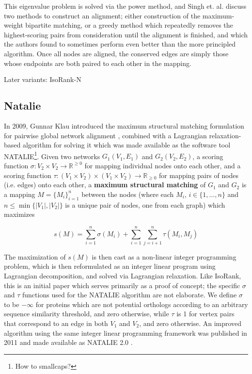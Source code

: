 \documentclass[12pt]{thesis}
\theoremstyle{plain}
\theoremstyle{definition}
\theoremstyle{remark}
\newcommand{\R}{\mathbb{R}}
\begin{document}
This eigenvalue problem is solved via the power method, and Singh et. al. discuss two methods to construct an alignment; either construction of the maximum-weight bipartite matching, or a greedy method which repeatedly removes the highest-scoring pairs from consideration until the alignment is finished, and which the authors found to sometimes perform even better than the more principled algorithm. Once all nodes are aligned, the conserved edges are simply those whose endpoints are both paired to each other in the mapping.

Later variants: IsoRank-N

\subsection{Natalie}

In 2009, Gunnar Klau introduced the maximum structural matching formulation for pairwise global network alignment \cite{Klau_2009}, combined with a Lagrangian relaxation-based algorithm for solving it which was made available as the software tool NATALIE\footnote{How to smallcaps?}. Given two networks $G_1(V_1,E_1)$ and $G_2(V_2,E_2)$, a scoring function $\sigma:V_2\times V_2\rightarrow \R^{\geq 0}$ for mapping individual nodes onto each other, and a scoring function $\tau:(V_1\times V_2)\times (V_1\times V_2)\rightarrow\R_{\geq 0}$ for mapping pairs of nodes (i.e. edges) onto each other, a \textbf{maximum structural matching} of $G_1$ and $G_2$ is a mapping $M=\{M_i\}_{i=1}^n$ between the nodes (where each $M_i$, $i\in \{1,\dots,n\}$ and $n\leq \min\{|V_1|,|V_2|\}$ is a unique pair of nodes, one from each graph) which maximizes

\[s(M) = \sum_{i=1}^n \sigma(M_i) + \sum_{i=1}^n \sum_{j=i+1}^n \tau(M_i,M_j) \]

The maximization of $s(M)$ is then cast as a non-linear integer programming problem, which is then reformulated as an integer linear program using Lagrangian decomposition, and solved via Lagrangian relaxation. Like IsoRank, this is an initial paper which serves primarily as a proof of concept; the specific $\sigma$ and $\tau$ functions used for the NATALIE algorithm are not elaborate. We define $\sigma$ to be $-\infty$ for proteins which are not potential orthologs according to an arbitrary sequence similarity threshold, and zero otherwise, while $\tau$ is 1 for vertex pairs that correspond to an edge in both $V_1$ and $V_2$, and zero otherwise. An improved algorithm using the same integer linear programming framework was published in 2011 and made available as NATALIE 2.0 \cite{el2011lagrangian}.
\end{document}

